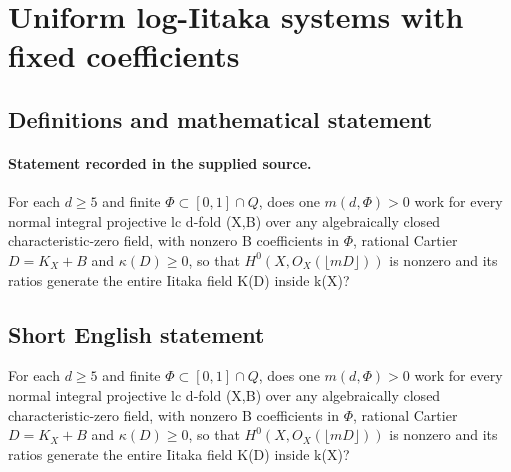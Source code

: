 \documentclass[11pt]{article}
\begin{document}
\section*{Uniform log-Iitaka systems with fixed coefficients}\label{30007074}
\subsection{Definitions and mathematical statement}
\paragraph{Statement recorded in the supplied source.}
For each $d\geq 5$ and finite $\Phi \subset [0,1]\cap Q$, does one $m(d,\Phi )>0$ work for every normal integral projective lc d-fold (X,B) over any algebraically closed characteristic-zero field, with nonzero B coefficients in $\Phi $, rational Cartier $D=K_X+B$ and $\kappa (D)\geq 0$, so that $H^{0}(X,O_X(\lfloor mD\rfloor ))$ is nonzero and its ratios generate the entire Iitaka field K(D) inside k(X)?
\subsection{Short English statement}
For each $d\geq 5$ and finite $\Phi \subset [0,1]\cap Q$, does one $m(d,\Phi )>0$ work for every normal integral projective lc d-fold (X,B) over any algebraically closed characteristic-zero field, with nonzero B coefficients in $\Phi $, rational Cartier $D=K_X+B$ and $\kappa (D)\geq 0$, so that $H^{0}(X,O_X(\lfloor mD\rfloor ))$ is nonzero and its ratios generate the entire Iitaka field K(D) inside k(X)?
\end{document}
